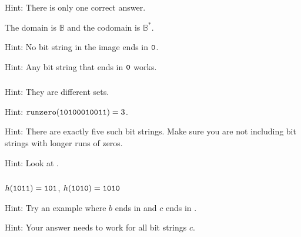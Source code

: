\subsubsection*{ \answers}
\begin{apart}
    \item {}
    \item Hint: There is only one correct answer.
    \item The domain is $\mathbb{B}$ and the codomain is $\mathbb{B}^*$.
    \item Hint: No bit string in the image ends in $\texttt{0}$. 
    \item Hint: Any bit string that ends in $\texttt{0}$ works.
\end{apart}

\subsubsection*{ \answers}
\begin{apart}
    \item Hint: They are different sets.
    \item Hint: $\texttt{runzero}(\texttt{10100010011})=3$.
    \item Hint: There are exactly five such bit strings.  Make sure you are not including bit strings with longer runs of zeros.
    \item Hint: Look at .
\end{apart}

\subsubsection*{ \answers}
\begin{apart}
    \item $h(\texttt{1011})=\texttt{101}$, $h(\texttt{1010})=\texttt{1010}$
    \item Hint: Try an example where $b$ ends in  and $c$ ends in .
    \item Hint: Your answer needs to work for all bit strings $c$.
\end{apart}




